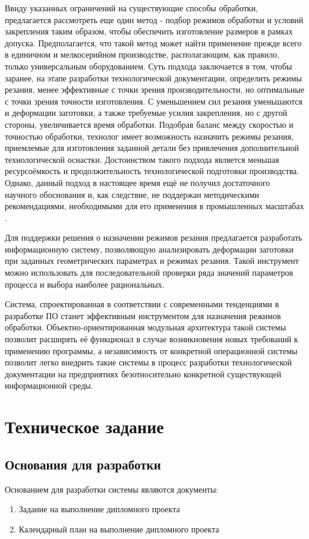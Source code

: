 \documentclass[14pt,oneside,final]{extreport}
\begin{document}
	Ввиду указанных ограничений на существующие способы обработки, предлагается рассмотреть еще один метод - подбор режимов обработки и условий закрепления таким образом, чтобы обеспечить изготовление размеров в рамках допуска. Предполагается, что такой метод может найти применение прежде всего в единичном и мелкосерийном производстве, располагающим, как правило, только универсальным оборудованием. Суть подхода заключается в том, чтобы заранее, на этапе разработки технологической документации, определить режимы резания, менее эффективные с точки зрения производительности, но оптимальные с точки зрения точности изготовления. С уменьшением сил резания уменьшаются и деформации заготовки, а также требуемые усилия закрепления, но с другой стороны, увеличивается время обработки.  Подобрав баланс между скоростью и точностью обработки, технолог имеет возможность назначить режимы резания, приемлемые для изготовления заданной детали без привлечения дополнительной технологической оснастки.  Достоинством такого подхода является меньшая ресурсоёмкость и продолжительность технологической подготовки производства. Однако, данный подход в настоящее время ещё не получил достаточного научного обоснования и, как следствие, не поддержан методическими рекомендациями, необходимыми для его применения в промышленных масштабах \cite{article:zhargalova}.
	
	Для поддержки решения о назначении режимов резания предлагается разработать информационную систему, позволяющую анализировать деформации заготовки при заданных геометрических параметрах и режимах резания. Такой инструмент можно использовать для последовательной проверки ряда значений параметров процесса и выбора наиболее рациональных. 
	
	Система, спроектированная в соответствии с современными тенденциями в разработке ПО станет эффективным инструментом для назначения режимов обработки. Объектно-ориентированная модульная архитектура такой системы позволит расширять её функционал в случае возникновения новых требований к применению программы, а независимость от конкретной операционной системы позволит легко внедрить такие системы в процесс разработки технологической документации на предприятиях безотносительно конкретной существующей информационной среды.
	
	
	\chapter{Техническое задание}	
	
	\section{Основания для разработки}
	Основанием для разработки системы являются документы:
	\begin{enumerate}
	\item Задание на выполнение дипломного проекта
	\item Календарный план на выполнение дипломного проекта
	\end{enumerate}
	
\end{document}
